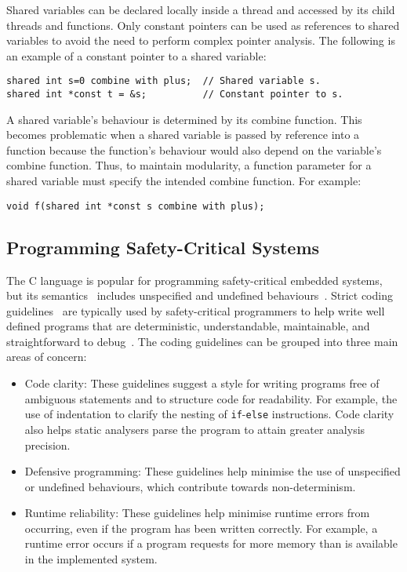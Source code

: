 Shared variables can be declared locally inside a thread 
and accessed by its child threads and functions. Only 
constant pointers can be used as references to shared variables
to avoid the need to perform complex pointer analysis. The 
following is an example of a constant pointer to a shared 
variable:
\begin{lstlisting}[style=snippet]
shared int s=0 combine with plus;  // Shared variable s.
shared int *const t = &s;          // Constant pointer to s.
\end{lstlisting}
A shared variable's behaviour is determined by its 
combine function. This becomes problematic when a 
shared variable is passed by reference into a function
because the function's behaviour would also depend on the 
variable's combine function. 
Thus, to maintain modularity, a function parameter for a 
shared variable must specify the intended combine 
function. For example:
\begin{lstlisting}[style=snippet]
void f(shared int *const s combine with plus);
\end{lstlisting}



\subsection{Programming Safety-Critical Systems}
\label{sec:foreLanguage_programming}
The C language is popular for programming safety-critical embedded systems, 
but its semantics~\cite{programming_languages_c} includes unspecified 
and undefined behaviours~\cite{programming_languages_c_pitfalls}. Strict 
coding guidelines~\cite{safety_critical_coding_misrac_standard,safety_critical_coding_power_10,safety_critical_coding_jpl} 
are typically used by safety-critical programmers to help write well 
defined programs that are deterministic, understandable, maintainable, 
and straightforward to debug~\cite{wcet_software_structure,safety_critical_coding_misrac_overview}. 
The coding guidelines can be grouped into three main areas of concern: 
\begin{itemize}
	\item Code clarity: These guidelines suggest a style for writing programs
		  free of ambiguous statements and to structure code for readability. 
		  For example, the use of indentation to clarify the nesting of 
		  \verb$if$-\verb$else$ instructions.
		  Code clarity also helps static analysers parse the program to 
		  attain greater analysis precision.
	\item Defensive programming: These guidelines help minimise the use of 
		  unspecified or undefined behaviours, which contribute towards
		  non-determinism.
	\item Runtime reliability: These guidelines help minimise runtime errors 
		  from occurring, even if the program has been written correctly. 
		  For example, a runtime error occurs if a program requests for 
		  more memory than is available in the implemented system. 
\end{itemize}

